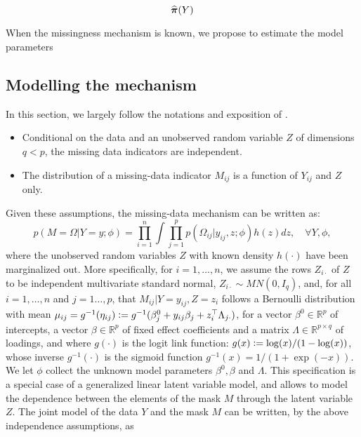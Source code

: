 \documentclass{article}
\begin{document}
\begin{equation}
    \widehat{{\bm{\pi}}}(Y)
\end{equation}

When the missingness mechanism is known, we propose to estimate the model parameters 

\subsection{Modelling the mechanism}
In this section, we largely follow the notations and exposition of \textcite{sportisse_imputation_2020}.
\begin{itemize}
    \item Conditional on the data and an unobserved random variable $Z$ of dimensions $q<p$, the missing data indicators are independent.
    \item The distribution of a missing-data indicator $M_{ij}$ is a function of $Y_{ij}$ and $Z$ only.
\end{itemize}
Given these assumptions, the missing-data mechanism can be written as:
%
\begin{equation}
    p(M = \Omega | Y=y; \phi) = \prod_{i=1}^n \int \prod_{j=1}^p p(\Omega_{ij} | y_{ij}, z; \phi) h(z) dz, \quad \forall Y, \phi,
\end{equation}
%
where the unobserved random variables $Z$ with known density $h(\cdot)$ have been marginalized out. More specifically, for $i=1, \dots, n$, we assume the rows $Z_{i\cdot}$ of $Z$ to be independent multivariate standard normal, $Z_{i\cdot}\sim MN(0, I_q)$, and, for all $i=1, \dots, n$ and $j=1\dots, p$, that $M_{ij} | Y=y_{ij}, Z=z_i$ follows a Bernoulli distribution with mean $\mu_{ij} = g^{-1}(\eta_{ij})\vcentcolon = g^{-1}(\beta_j^0 + y_{ij}\beta_j + z_i^\top\Lambda_{j\cdot})$, for a vector $\beta^0\in\mathbb R^p$ of intercepts, a vector $\beta\in\mathbb R^p$ of fixed effect coefficients and a matrix $\Lambda\in\mathbb R^{p\times q}$ of loadings, and where $g(\cdot)$ is the logit link function: $g(x) \vcentcolon= \log(x)/(1-\log(x))$, whose inverse $g^{-1}(\cdot)$ is the sigmoid function $g^{-1}(x) = 1/(1+ \exp(-x))$. We let $\phi$ collect the unknown model parameters $\beta^0, \beta$ and $\Lambda$.
This specification is a special case of a generalized linear latent variable model, and allows to model the dependence between the elements of the mask $M$ through the latent variable $Z$. The joint model of the data $Y$ and the mask $M$ can be written, by the above independence assumptions, as
\end{document}
